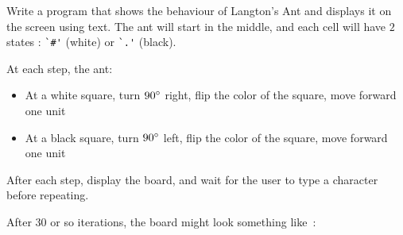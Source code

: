 

\begin{exercise}
Write a program that shows the behaviour of Langton's Ant and
displays it on the screen using text. The ant will start in the
middle, and each cell will have $2$ states : \verb^`#'^ (white)
or \verb^`.'^ (black).

At each step, the ant:
\begin{itemize}
\item At a white square, turn $90\degree$ right, flip the color of
    the square, move forward one unit
\item At a black square, turn $90\degree$ left, flip the color of
    the square, move forward one unit
\end{itemize}

After each step, display the board, and wait for the user
to type a character before repeating.
\end{exercise}

After $30$ or so iterations, the board might look something like~:


